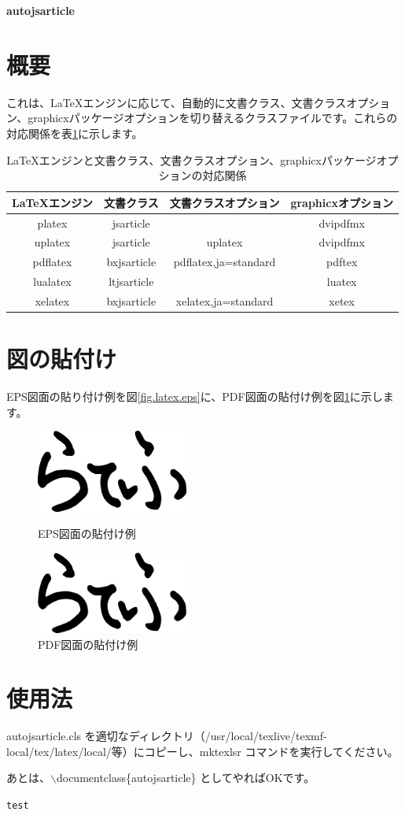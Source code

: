 \documentclass{autojsarticle}
\begin{document}
\begin{center}
	\huge\bfseries autojsarticle
\end{center}

\section{概要}

これは、\LaTeX エンジンに応じて、自動的に文書クラス、文書クラスオプション、graphicxパッケージオプションを切り替えるクラスファイルです。これらの対応関係を表\ref{tbl.correspondence}に示します。

\begin{table}[h]
	\centering
	\caption{\LaTeX エンジンと文書クラス、文書クラスオプション、graphicxパッケージオプションの対応関係}
	\label{tbl.correspondence}
	\begin{tabular}{|c|c|c|c|}
		\hline 
		\LaTeX エンジン & 文書クラス & 文書クラスオプション & graphicxオプション \\ 
		\hline\hline 
		platex & jsarticle & & dvipdfmx \\ 
		\hline 
		uplatex & jsarticle & uplatex & dvipdfmx \\ 
		\hline 
		pdflatex & bxjsarticle & pdflatex,ja=standard & pdftex \\ 
		\hline 
		lualatex & ltjsarticle &  & luatex \\ 
		\hline 
		xelatex & bxjsarticle & xelatex,ja=standard & xetex \\ 
		\hline 
	\end{tabular} 
\end{table}

\section{図の貼付け}

EPS図面の貼り付け例を図\ref{fig.latex.eps}に、PDF図面の貼付け例を図\ref{fig.latex.pdf}に示します。

\begin{figure}[h]
	\centering
	\includegraphics[width=5cm]{latex.eps}
	\caption{EPS図面の貼付け例}
	\label{fig.latex.eps}
	\bigskip
	\includegraphics[width=5cm]{latex.pdf}
	\caption{PDF図面の貼付け例}
	\label{fig.latex.pdf}
\end{figure}

\section{使用法}

autojsarticle.cls を適切なディレクトリ（\slash usr\slash local\slash  texlive\slash texmf-local\slash tex\slash latex\slash local\slash 等）にコピーし、mktexlsr コマンドを実行してください。

あとは、$\backslash$documentclass\{autojsarticle\} としてやればOKです。

\verb/test/
\end{document}
